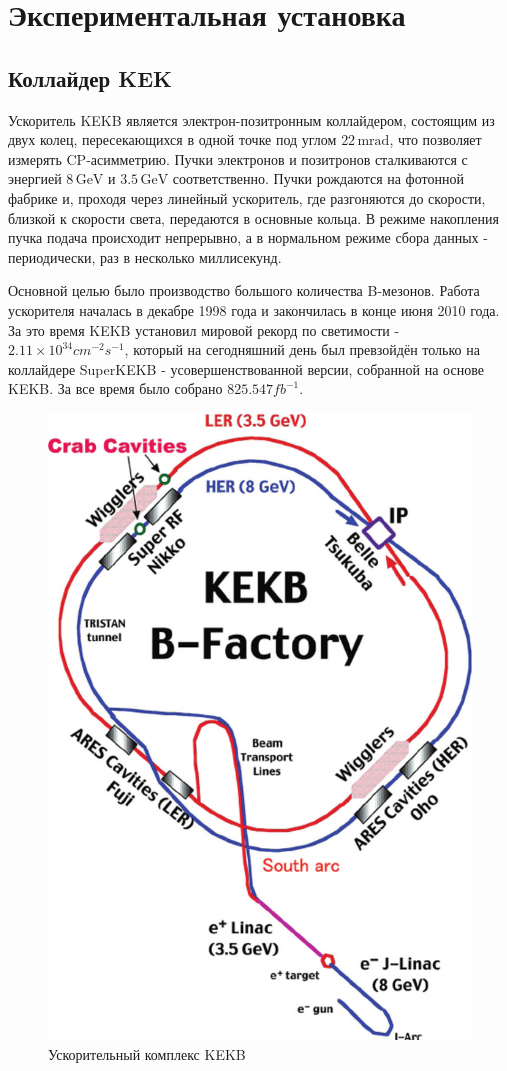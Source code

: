\section{Экспериментальная установка}

\subsection{Коллайдер KEK}
Ускоритель KEKB является электрон-позитронным коллайдером, состоящим из двух 
колец, пересекающихся в одной точке под углом $22\,\text{mrad}$, что позволяет измерять CP-асимметрию. 
Пучки электронов и позитронов сталкиваются с энергией $8\,\text{GeV}$ и $3.5\,\text{GeV}$ соответственно.
Пучки рождаются на фотонной фабрике и, проходя через линейный ускоритель, где разгоняются до скорости, близкой к скорости света, 
передаются в основные кольца. В режиме накопления пучка подача происходит непрерывно, а в нормальном режиме 
сбора данных - периодически, раз в несколько миллисекунд.

Основной целью было производство большого количества B-мезонов. Работа ускорителя началась в декабре
1998 года и закончилась в конце июня 2010 года. За это время KEKB установил мировой
рекорд по светимости - $2.11\times 10^{34} cm^{-2}s^{-1}$, который на сегодняшний день был
превзойдён только на коллайдере SuperKEKB - усовершенствованной версии, собранной
на основе KEKB. За все время было собрано $825.547fb^{-1}$.

\begin{figure}[H]
    \centering
    \includegraphics[width=0.5\linewidth]{img/kekb.png}
    \caption{Ускорительный комплекс KEKB}
    \label{the:kek}
\end{figure}

